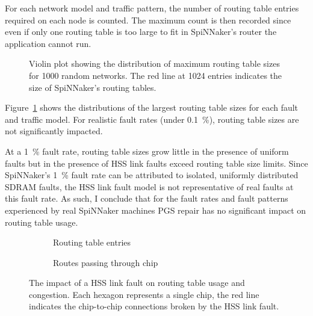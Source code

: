 			For each network model and traffic pattern, the number of routing table
			entries required on each node is counted. The maximum count is then
			recorded since even if only one routing table is too large to fit in
			SpiNNaker's router the application cannot run.
			
			\begin{figure}
				\center
				
				\caption[Routing table sizes for \num{1000} random networks.]%
				{Violin plot showing the distribution of maximum routing table
				sizes for \num{1000} random networks. The red line at \num{1024}
				entries indicates the size of SpiNNaker's routing tables.}
				\label{fig:routing-entries}
			\end{figure}
			
			Figure~\ref{fig:routing-entries} shows the distributions of the largest
			routing table sizes for each fault and traffic model. For realistic fault
			rates (under \SI{0.1}{\percent}), routing table sizes are not
			significantly impacted.
			
			At a \SI{1}{\percent} fault rate, routing table sizes grow little in the
			presence of uniform faults but in the presence of HSS link faults exceed
			routing table size limits. Since SpiNNaker's \SI{1}{\percent} fault rate
			can be attributed to isolated, uniformly distributed SDRAM faults, the
			HSS link fault model is not representative of real faults at this fault
			rate. As such, I conclude that for the fault rates and fault patterns
			experienced by real SpiNNaker machines PGS repair has no significant
			impact on routing table usage.
			
			\begin{figure}
				\center
				\begin{subfigure}{0.48\linewidth}
					\center
					
					\caption{Routing table entries}
					\label{fig:hss-link-routing-table-usage}
				\end{subfigure}
				\begin{subfigure}{0.48\linewidth}
					\center
					
					\caption{Routes passing through chip}
					\label{fig:hss-link-resource-usage}
				\end{subfigure}
				
				\caption[The impact of a HSS link fault.]%
				{The impact of a HSS link fault on routing table usage and
				congestion. Each hexagon represents a single chip, the red line
				indicates the chip-to-chip connections broken by the HSS link fault.}
				\label{fig:hss-link-usage}
			\end{figure}
			

